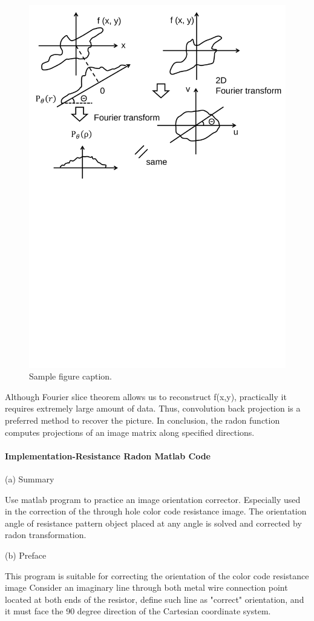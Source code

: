 \documentclass{article}
\begin{document}
\begin{figure}
	\centering
	\includegraphics[width=0.7\linewidth]{p1.pdf}
	\caption{Sample figure caption.}
	\label{fig:p1svg}
\end{figure}

Although Fourier slice theorem allows us to reconstruct f(x,y),  practically it requires extremely large amount of data. Thus, convolution back projection is a preferred method to recover the picture. In conclusion, the radon function computes projections of an image matrix along specified directions.\citep{mathworksRadonTransform}

\paragraph{Implementation-Resistance Radon Matlab Code}

(a) Summary

Use matlab program to practice an image orientation corrector.
Especially used in the correction of the through hole color code resistance image.
The orientation angle of resistance pattern object placed at any angle is solved and corrected by radon transformation.

(b) Preface

This program is suitable for correcting the orientation of the color code resistance image
Consider an imaginary line through both metal wire connection point located at both ends of the resistor, define such line as "correct" orientation, and it must face the 90 degree direction of the Cartesian coordinate system.
\end{document}
